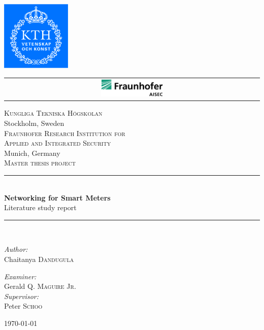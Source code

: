 \begin{titlepage}
\newcommand{\HRule}{\rule{\linewidth}{0.5mm}}
\begin{center}

\includegraphics[width=0.25\textwidth]{logo/kth_cmyk.pdf}
\begin{tabular}{ c }
\includegraphics[width=0.25\textwidth]{logo/aisec.pdf} \\[2.3cm]  
\end{tabular}

\textsc{\LARGE Kungliga Tekniska H\"ogskolan}\\
{\large Stockholm, Sweden}\\[1.5cm]
\textsc{\LARGE Fraunhofer Research Institution for}\\ [0.25cm]
\textsc{\LARGE Applied and Integrated Security}\\
{\large Munich, Germany}\\[1.5cm]
\textsc{\Large Master thesis project}\\[0.5cm]


\HRule \\[0.4cm]
{ \huge \bfseries Networking for Smart Meters}\\[0.4cm]
{\large Literature study report}
\HRule \\[1.5cm]

\begin{minipage}{0.4\textwidth}
\begin{flushleft} \large
\emph{Author:}\\
Chaitanya \textsc{Dandugula}
\end{flushleft}
\end{minipage}
\begin{minipage}{0.4\textwidth}
\begin{flushright} \large
\emph{Examiner:} \\
Gerald \textsc{Q. Maguire Jr.}\\
\emph{Supervisor:} \\
Peter \textsc{Schoo}
\end{flushright}
\end{minipage}

\vfill

{\large \today}

\end{center}

\end{titlepage}